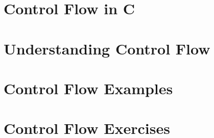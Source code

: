 


\clearpage
\def\pageLang{c}
\section{Control Flow in C} %
\label{sec:control_flow_in_c}










% 





\clearpage
\def\pageLang{None}
\section{Understanding Control Flow} %
\label{sec:understanding_control_flow}




\clearpage
\section{Control Flow Examples} %
\label{sec:control_flow_examples}




\clearpage
\section{Control Flow Exercises} %
\label{sec:control_flow_exercises}






